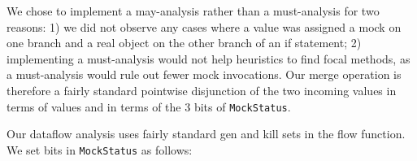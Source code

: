 We chose to implement a may-analysis rather than a must-analysis for two reasons: 1) we did not observe any cases where a value was assigned a mock on one branch and a real object on the other branch of an if statement; 2) implementing a must-analysis would not help heuristics to find focal methods, as a must-analysis would rule out fewer mock invocations. Our merge operation is therefore a fairly standard pointwise disjunction of the two incoming values in terms of values and in terms of the 3 bits of \texttt{MockStatus}.





Our dataflow analysis uses fairly standard gen and kill sets in the flow function. We set bits in \texttt{MockStatus} as follows:

